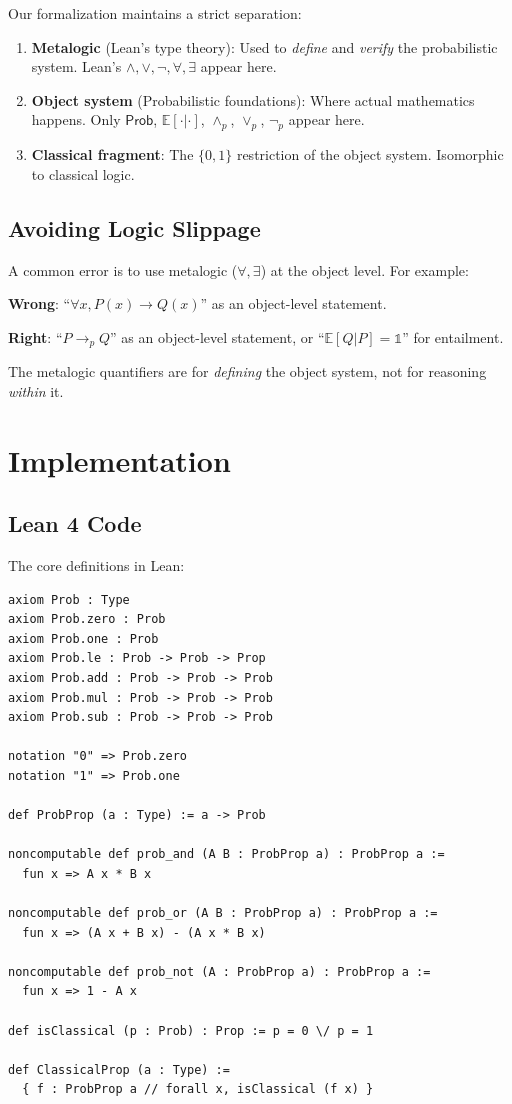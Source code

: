 \documentclass[11pt,a4paper]{article}
\newcommand{\Prob}{\mathsf{Prob}}
\newcommand{\E}{\mathbb{E}}
\newcommand{\pand}{\wedge_p}
\newcommand{\por}{\vee_p}
\newcommand{\pnot}{\neg_p}
\newcommand{\pimplies}{\rightarrow_p}
\newcommand{\pone}{\mathbb{1}}
\begin{document}
Our formalization maintains a strict separation:

\begin{enumerate}
    \item \textbf{Metalogic} (Lean's type theory): Used to \emph{define} and \emph{verify} the probabilistic system. Lean's $\land, \lor, \neg, \forall, \exists$ appear here.

    \item \textbf{Object system} (Probabilistic foundations): Where actual mathematics happens. Only $\Prob$, $\E[\cdot|\cdot]$, $\pand$, $\por$, $\pnot$ appear here.

    \item \textbf{Classical fragment}: The $\{0,1\}$ restriction of the object system. Isomorphic to classical logic.
\end{enumerate}

\subsection{Avoiding Logic Slippage}

A common error is to use metalogic ($\forall, \exists$) at the object level. For example:

\textbf{Wrong}: ``$\forall x, P(x) \to Q(x)$'' as an object-level statement.

\textbf{Right}: ``$P \pimplies Q$'' as an object-level statement, or ``$\E[Q|P] = \pone$'' for entailment.

The metalogic quantifiers are for \emph{defining} the object system, not for reasoning \emph{within} it.

\section{Implementation}

\subsection{Lean 4 Code}

The core definitions in Lean:

\begin{verbatim}
axiom Prob : Type
axiom Prob.zero : Prob
axiom Prob.one : Prob
axiom Prob.le : Prob -> Prob -> Prop
axiom Prob.add : Prob -> Prob -> Prob
axiom Prob.mul : Prob -> Prob -> Prob
axiom Prob.sub : Prob -> Prob -> Prob

notation "0" => Prob.zero
notation "1" => Prob.one

def ProbProp (a : Type) := a -> Prob

noncomputable def prob_and (A B : ProbProp a) : ProbProp a :=
  fun x => A x * B x

noncomputable def prob_or (A B : ProbProp a) : ProbProp a :=
  fun x => (A x + B x) - (A x * B x)

noncomputable def prob_not (A : ProbProp a) : ProbProp a :=
  fun x => 1 - A x

def isClassical (p : Prob) : Prop := p = 0 \/ p = 1

def ClassicalProp (a : Type) :=
  { f : ProbProp a // forall x, isClassical (f x) }
\end{verbatim}
\end{document}

